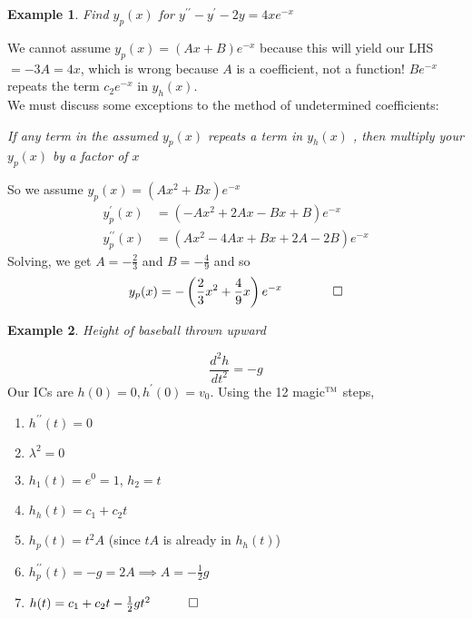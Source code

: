 \documentclass{report}
\newtheorem{ex}{Example}[section]
\begin{document}
\newpage
\begin{ex}
Find $y_p(x)$ for $y^{\prime\prime} - y^\prime - 2y = 4xe^{-x}$
\end{ex}\noindent
We cannot assume $y_p(x) = (Ax + B)e^{-x}$ because this will yield our LHS $= -3A = 4x$, which is wrong because $A$ is a coefficient, not a function! $Be^{-x}$ repeats the term $c_2e^{-x}$ in $y_h(x)$.\\
We must discuss some exceptions to the method of undetermined coefficients:
\begin{center}
\textit{If any term in the assumed $y_p(x)$ repeats a term in $y_h(x)$ , then multiply your $y_p(x)$ by a factor of $x$}
\end{center}
So we assume $y_p(x) = (Ax^2 + Bx)e^{-x}$
\begin{align*}
y_p^\prime(x) &= (-Ax^2 + 2Ax - Bx + B)e^{-x} \\
y_p^{\prime\prime}(x) &= (Ax^2 -4Ax + Bx + 2A - 2B)e^{-x}
\end{align*}
Solving, we get $A = -\frac{2}{3}$ and $B = -\frac{4}{9}$ and so
$$y_p(x) = -\left(\frac{2}{3}x^2 + \frac{4}{9}x\right)e^{-x} \qquad \qed$$
\begin{ex}
Height of baseball thrown upward
\end{ex}
$$\frac{d^2h}{dt^2} = -g$$
Our ICs are $h(0) = 0, h^\prime(0) = v_0$. Using the 12 magic$^\textsc{tm}$ steps,
\begin{enumerate}
\item $h^{\prime\prime}(t) = 0$
\item $\lambda^2 = 0$
\item $h_1(t) = e^0 = 1$, $h_2 = t$
\item $h_h(t) = c_1 + c_2t$
\item $h_p(t) = t^2A$ (since $tA$ is already in $h_h(t)$)
\item $h^{\prime\prime}_p(t) = -g = 2A \implies A = -\frac{1}{2}g$
\item $h(t) = c_1 + c_2t - \frac{1}{2}gt^2 \quad \qed$
\end{enumerate}

\end{document}
